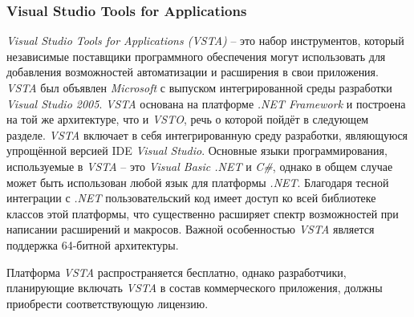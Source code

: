 \subsubsection{Visual Studio Tools for Applications}

{\it Visual Studio Tools for Applications (VSTA)} -- это набор инструментов, который независимые поставщики программного обеспечения могут использовать для добавления возможностей автоматизации и расширения в свои приложения. {\it VSTA} был объявлен {\it Microsoft} с выпуском интегрированной среды разработки {\it Visual Studio 2005}. {\it VSTA} основана на платформе {\it .NET Framework} и построена на той же архитектуре, что и {\it VSTO}, речь о которой пойдёт в следующем разделе. {\it VSTA} включает в себя интегрированную среду разработки, являющуюся упрощённой версией IDE {\it Visual Studio}. Основные языки программирования, используемые в {\it VSTA} -- это {\it Visual Basic .NET} и {\it C\#}, однако в общем случае может быть использован любой язык для платформы {\it .NET}. Благодаря тесной интеграции с {\it .NET} пользовательский код имеет доступ ко всей библиотеке классов этой платформы, что существенно расширяет спектр возможностей при написании расширений и макросов. Важной особенностью {\it VSTA} является поддержка 64-битной архитектуры. 

Платформа {\it VSTA} распространяется бесплатно, однако разработчики, планирующие включать {\it VSTA} в состав коммерческого приложения, должны приобрести соответствующую лицензию.
